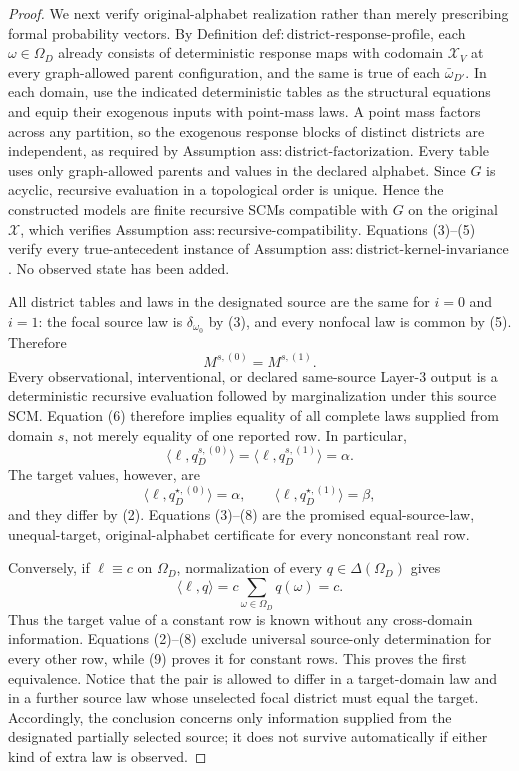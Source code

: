 \documentclass{article}
\begin{document}
\begin{proof}
We next verify original-alphabet realization rather than merely prescribing formal probability vectors.  By Definition \(\mathrm{def:district\text{-}response\text{-}profile}\), each \(\omega\in\Omega_D\) already consists of deterministic response maps with codomain \(\mathcal X_V\) at every graph-allowed parent configuration, and the same is true of each \(\bar\omega_{D'}\).  In each domain, use the indicated deterministic tables as the structural equations and equip their exogenous inputs with point-mass laws.  A point mass factors across any partition, so the exogenous response blocks of distinct districts are independent, as required by Assumption \(\mathrm{ass:district\text{-}factorization}\).  Every table uses only graph-allowed parents and values in the declared alphabet.  Since \(G\) is acyclic, recursive evaluation in a topological order is unique.  Hence the constructed models are finite recursive SCMs compatible with \(G\) on the original \(\mathcal X\), which verifies Assumption \(\mathrm{ass:recursive\text{-}compatibility}\).  Equations (3)--(5) verify every true-antecedent instance of Assumption \(\mathrm{ass:district\text{-}kernel\text{-}invariance}\).  No observed state has been added.

All district tables and laws in the designated source are the same for \(i=0\) and \(i=1\): the focal source law is \(\delta_{\omega_0}\) by (3), and every nonfocal law is common by (5).  Therefore
\[
M^{s,(0)}=M^{s,(1)}.
\tag{6}
\]
Every observational, interventional, or declared same-source Layer-3 output is a deterministic recursive evaluation followed by marginalization under this source SCM.  Equation (6) therefore implies equality of all complete laws supplied from domain \(s\), not merely equality of one reported row.  In particular,
\[
\langle\ell,q_D^{s,(0)}\rangle
=\langle\ell,q_D^{s,(1)}\rangle
=\alpha.
\tag{7}
\]
The target values, however, are
\[
\langle\ell,q_D^{\star,(0)}\rangle=\alpha,
\qquad
\langle\ell,q_D^{\star,(1)}\rangle=\beta,
\tag{8}
\]
and they differ by (2).  Equations (3)--(8) are the promised equal-source-law, unequal-target, original-alphabet certificate for every nonconstant real row.

Conversely, if \(\ell\equiv c\) on \(\Omega_D\), normalization of every \(q\in\Delta(\Omega_D)\) gives
\[
\langle\ell,q\rangle
=c\sum_{\omega\in\Omega_D}q(\omega)
=c.
\tag{9}
\]
Thus the target value of a constant row is known without any cross-domain information.  Equations (2)--(8) exclude universal source-only determination for every other row, while (9) proves it for constant rows.  This proves the first equivalence.  Notice that the pair is allowed to differ in a target-domain law and in a further source law whose unselected focal district must equal the target.  Accordingly, the conclusion concerns only information supplied from the designated partially selected source; it does not survive automatically if either kind of extra law is observed.


\end{proof}
\end{document}
